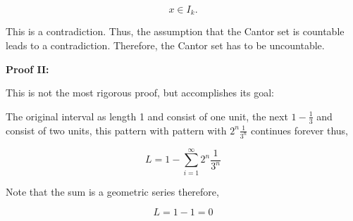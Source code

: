 \[
	x \in I_{k}.
\]

This is a contradiction. Thus, the assumption that the Cantor set is countable leads to a contradiction.
Therefore, the Cantor set has to be uncountable.

\QED

\textbf{Proof II:}

This is not the most rigorous proof, but accomplishes its goal:

The original interval as length 1 and consist of one unit, the next \(1 - \frac{1}{3}\) and consist of two units, this pattern with  pattern with
\(2^n \frac{1}{3^n}\) continues forever thus,

\[
	L = 1 - \sum_{i = 1}^{\infty} 2^n \frac{1}{3^n}
\]

Note that the sum is a geometric series therefore,

\[
	L = 1 - 1 = 0
\]

\QED
